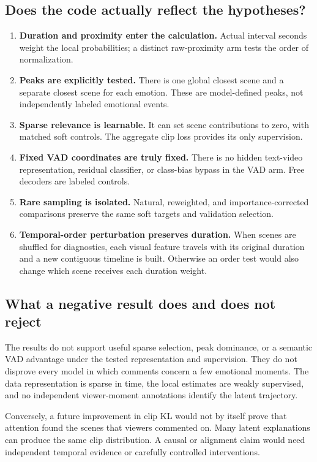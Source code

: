 \documentclass[11pt,a4paper]{article}
\begin{document}
\subsection{Does the code actually reflect the hypotheses?}
\begin{enumerate}
\item \textbf{Duration and proximity enter the calculation.} Actual interval seconds weight the local probabilities; a distinct raw-proximity arm tests the order of normalization.
\item \textbf{Peaks are explicitly tested.} There is one global closest scene and a separate closest scene for each emotion. These are model-defined peaks, not independently labeled emotional events.
\item \textbf{Sparse relevance is learnable.} It can set scene contributions to zero, with matched soft controls. The aggregate clip loss provides its only supervision.
\item \textbf{Fixed VAD coordinates are truly fixed.} There is no hidden text-video representation, residual classifier, or class-bias bypass in the VAD arm. Free decoders are labeled controls.
\item \textbf{Rare sampling is isolated.} Natural, reweighted, and importance-corrected comparisons preserve the same soft targets and validation selection.
\item \textbf{Temporal-order perturbation preserves duration.} When scenes are shuffled for diagnostics, each visual feature travels with its original duration and a new contiguous timeline is built. Otherwise an order test would also change which scene receives each duration weight.
\end{enumerate}

\subsection{What a negative result does and does not reject}
The results do not support useful sparse selection, peak dominance, or a semantic VAD advantage under the tested representation and supervision. They do not disprove every model in which comments concern a few emotional moments. The data representation is sparse in time, the local estimates are weakly supervised, and no independent viewer-moment annotations identify the latent trajectory.

Conversely, a future improvement in clip KL would not by itself prove that attention found the scenes that viewers commented on. Many latent explanations can produce the same clip distribution. A causal or alignment claim would need independent temporal evidence or carefully controlled interventions.
\end{document}
